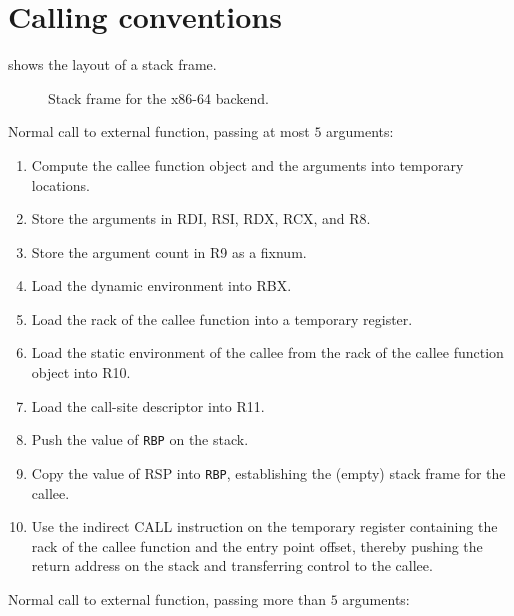 \section{Calling conventions}
\label{sec-x86-calling-conventions}

 shows the layout of a stack frame.

\begin{figure}
\begin{center}
\end{center}
\caption{\label{fig-x86-64-stack-frame}
Stack frame for the x86-64 backend.}
\end{figure}

Normal call to external function, passing at most $5$ arguments:

\begin{enumerate}
\item Compute the callee function object and the arguments into
  temporary locations.
\item Store the arguments in RDI, RSI, RDX, RCX, and R8.
\item Store the argument count in R9 as a fixnum.
\item Load the dynamic environment into RBX.
\item Load the rack of the callee function into a temporary register.
\item Load the static environment of the callee from the rack of the
  callee function object into R10.
\item Load the call-site descriptor into R11.
\item Push the value of \texttt{RBP} on the stack.
\item Copy the value of RSP into \texttt{RBP}, establishing the
  (empty) stack frame for the callee.
\item Use the indirect CALL instruction on the temporary register
  containing the rack of the callee function and the entry point
  offset, thereby pushing the return address on the stack and
  transferring control to the callee.
\end{enumerate}

Normal call to external function, passing more than $5$ arguments:

